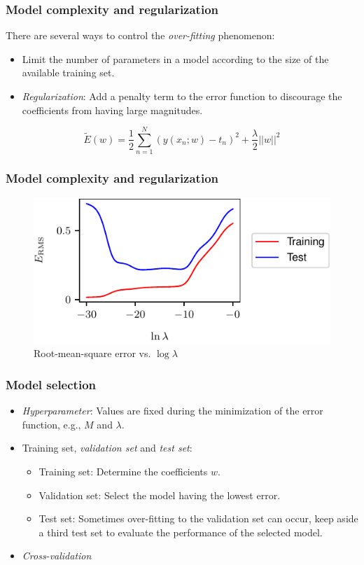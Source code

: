 \documentclass{beamer}
\begin{document}
\begin{frame}
    \frametitle{Model complexity and regularization}
    There are several ways to control the \emph{over-fitting} phenomenon:
    \begin{itemize}
        \item Limit the number of parameters in a model according to the size of the available training set.
        \item \emph{Regularization}: Add a penalty term to the error function to discourage the coefficients from having large magnitudes.
    \end{itemize}
    \begin{equation*}
        \tilde{E}(w)=\frac{1}{2}\sum_{n=1}^{N}(y(x_{n};w)-t_{n})^{2}+\frac{\lambda}{2}||w||^{2}
    \end{equation*}
\end{frame}

\begin{frame}
    \frametitle{Model complexity and regularization}
    \begin{figure}
        \caption{Root-mean-square error vs. $\log\lambda$}
        \includegraphics{Figure_10.pdf}
    \end{figure}
\end{frame}

\begin{frame}
    \frametitle{Model selection}
    \begin{itemize}
        \item \emph{Hyperparameter}: Values are fixed during the minimization of the error function, e.g., $M$ and $\lambda$.
        \item Training set, \emph{validation set} and \emph{test set}:
        \begin{itemize}
            \item Training set: Determine the coefficients $w$.
            \item Validation set: Select the model having the lowest error.
            \item Test set: Sometimes over-fitting to the validation set can occur, keep aside a third test set to evaluate the performance of the selected model.
        \end{itemize}
        \item \emph{Cross-validation}
    \end{itemize}
\end{frame}
\end{document}
